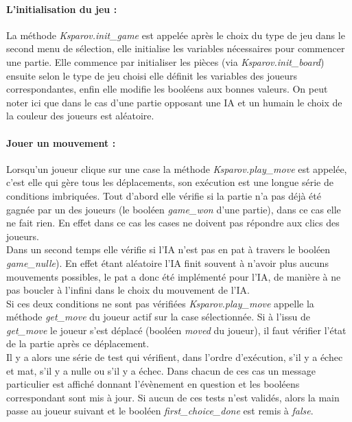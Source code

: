 \documentclass[a4paper]{article}
\begin{document}
\paragraph{L'initialisation du jeu :}La méthode \textit{Ksparov.init\_game} est appelée après le choix du type de jeu dans le second menu de sélection, elle initialise les variables nécessaires pour commencer une partie. Elle commence par initialiser les pièces (via \textit{Ksparov.init\_board}) ensuite selon le type de jeu choisi elle définit les variables des joueurs correspondantes, enfin elle modifie les booléens aux bonnes valeurs. On peut noter ici que dans le cas d'une partie opposant une IA et un humain le choix de la couleur des joueurs est aléatoire. 

\paragraph{Jouer un mouvement :}Lorsqu'un joueur clique sur une case la méthode \textit{Ksparov.play\_move} est appelée, c'est elle qui gère tous les déplacements, son exécution est une longue série de conditions imbriquées. Tout d'abord elle vérifie si la partie n'a pas déjà été gagnée par un des joueurs (le booléen \textit{game\_won} d'une partie), dans ce cas elle ne fait rien. En effet dans ce cas les cases ne doivent pas répondre aux clics des joueurs. \\

Dans un second temps elle vérifie si l'IA n'est pas en pat à travers le booléen \textit{game\_nulle}). En effet étant aléatoire l'IA finit souvent à n'avoir plus aucuns mouvements possibles, le pat a donc été implémenté pour l'IA, de manière à ne pas boucler à l'infini dans le choix du mouvement de l'IA. \\

Si ces deux conditions ne sont pas vérifiées \textit{Ksparov.play\_move} appelle la méthode \textit{get\_move} du joueur actif sur la case sélectionnée. Si à l'issu de \textit{get\_move} le joueur s'est déplacé (booléen \textit{moved} du joueur), il faut vérifier l'état de la partie après ce déplacement. \\ 

Il y a alors une série de test qui vérifient, dans l'ordre d'exécution, s'il y a échec et mat, s'il y a nulle ou s'il y a échec. Dans chacun de ces cas un message particulier est affiché donnant l'évènement en question et les booléens correspondant sont mis à jour. Si aucun de ces tests n'est validés, alors la main passe au joueur suivant et le booléen \textit{first\_choice\_done} est remis à \textit{false}.\\
\end{document}
